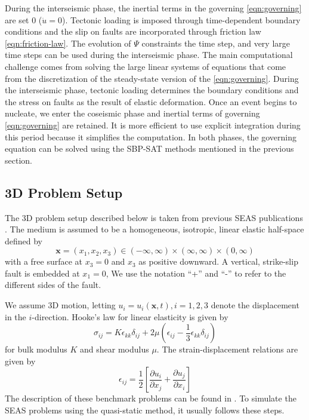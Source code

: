 During the interseismic phase, the inertial terms in the governing \autoref{eqn:governing} are set 0 ($\ddot{u} = 0$).
Tectonic loading is imposed through time-dependent boundary conditions and the slip on faults are incorporated through friction law \autoref{eqn:friction-law}.
The evolution of $\Psi$ constraints the time step, and very large time steps can be used during the interseismic phase.
The main computational challenge comes from solving the large linear systems of equations that come from the discretization of the steady-state version of the \autoref{eqn:governing}.
During the interseismic phase, tectonic loading determines the boundary conditions and the stress on faults as the result of elastic deformation.
Once an event begins to nucleate, we enter the coseismic phase and inertial terms of governing \autoref{eqn:governing} are retained.
It is more efficient to use explicit integration during this period because it simplifies the computation. In both phases, the governing equation can be solved using the SBP-SAT methods mentioned in the previous section.

\subsection{3D Problem Setup}
The 3D problem setup described below is taken from previous SEAS publications \citep{10.1785/0220190248}.
The medium is assumed to be a homogeneous, isotropic, linear elastic half-space defined by
\begin{equation} \label{eqn:domain}
    \textbf{x} = (x_1, x_2, x_3) \in (-\infty, \infty) \times (\infty, \infty) \times (0, \infty)
\end{equation}
with a free surface at $x_3 = 0$ and $x_3$ as positive downward. A vertical, strike-slip fault is embedded at $x_1 = 0$, We use the notation ``+'' and ``-'' to refer to the different sides of the fault. 

We assume 3D motion, letting $u_i = u_i(\textbf{x}, t), i = 1, 2, 3$ denote the displacement in the $i$-direction.
Hooke’s law for linear elasticity is given by
\begin{equation}
    \sigma_{ij} = K\epsilon_{kk}\delta_{ij} + 2\mu (\epsilon_{ij} - \frac{1}{3} \epsilon_{kk}\delta_{ij})
\end{equation}
for bulk modulus $K$ and shear modulus $\mu$. The strain-displacement relations are given by 
\begin{equation}
    \epsilon_{ij} = \frac{1}{2} \left[\frac{\partial u_i}{\partial x_j} + \frac{\partial u_j}{\partial x_i}\right]
\end{equation}
The description of these benchmark problems can be found in \citep{erickson2018seas,jiang2020seas}.
To simulate the SEAS problems using the quasi-static method, it usually follows these steps.

